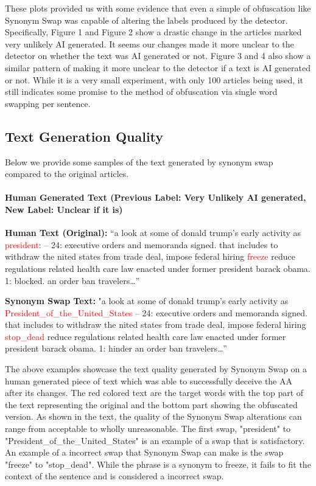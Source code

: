 \documentclass{article}
\begin{document}
These plots provided us with some evidence that even a simple of obfuscation like Synonym Swap was capable of altering the labels produced by the detector. Specifically, Figure 1 and Figure 2 show a drastic change in the articles marked very unlikely AI generated. It seems our changes made it more unclear to the detector on whether the text was AI generated or not. Figure 3 and 4 also show a similar pattern of making it more unclear to the detector if a text is AI generated or not. While it is a very small experiment, with only 100 articles being used, it still indicates some promise to the method of obfuscation via single word swapping per sentence.

\subsection{Text Generation Quality}
Below we provide some samples of the text generated by synonym swap compared to the original articles.
\paragraph{Human Generated Text (Previous Label: Very Unlikely AI generated, New Label: Unclear if it is)}

\hfill \break \textbf{Human Text (Original):} “a look at some of donald trump's early activity as \textcolor{red}{president}: -- 24: executive orders and memoranda signed. that includes to withdraw the nited states from trade deal, impose federal hiring \textcolor{red}{freeze} reduce regulations related health care law enacted under former president barack obama. 1: blocked. an order ban travelers…”

\hfill \break \textbf{Synonym Swap Text:} "a look at some of donald trump's early activity as \textcolor{red}{President\_of\_the\_United\_States} -- 24: executive orders and memoranda signed. that includes to withdraw the nited states from trade deal, impose federal hiring \textcolor{red}{stop\_dead} reduce regulations related health care law enacted under former president barack obama. 1: hinder an order ban travelers…”

\hfill \break The above examples showcase the text quality generated by Synonym Swap on a human generated piece of text which was able to successfully deceive the AA after its changes. The red colored text are the target words with the top part of the text representing the original and the bottom part showing the obfuscated version. As shown in the text, the quality of the Synonym Swap alterations can range from acceptable to wholly unreasonable. The first swap, "president" to "President\_of\_the\_United\_States" is an example of a swap that is satisfactory. An example of a incorrect swap that Synonym Swap can make is the swap "freeze" to "stop\_dead". While the phrase is a synonym to freeze, it fails to fit the context of the sentence and is considered a incorrect swap.
\end{document}

